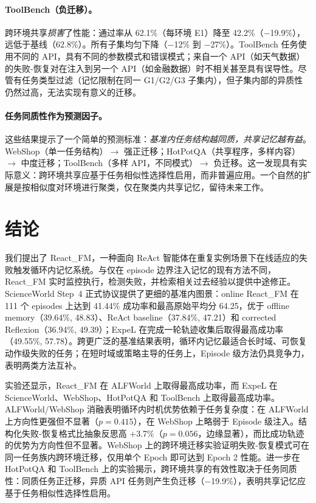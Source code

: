 \documentclass[11pt,a4paper]{article}
\newcommand{\method}{React\_FM}
\begin{document}
\paragraph{ToolBench（负迁移）。} 跨环境共享\emph{损害}了性能：通过率从 62.1\%（每环境 E1）降至 42.2\%（$-$19.9\%），远低于基线（62.8\%）。所有子集均匀下降（$-$12\% 到 $-$27\%）。ToolBench 任务使用不同的 API，具有不同的参数模式和错误模式；来自一个 API（如天气数据）的失败-恢复对在注入到另一个 API（如金融数据）时不相关甚至具有误导性。尽管有任务类型过滤（记忆限制在同一 G1/G2/G3 子集内），但子集内部的异质性仍然过高，无法实现有意义的迁移。

\paragraph{任务同质性作为预测因子。} 这些结果提示了一个简单的预测标准：\emph{基准内任务结构越同质，共享记忆越有益}。WebShop（单一任务结构）$\to$ 强正迁移；HotPotQA（共享程序，多样内容）$\to$ 中度迁移；ToolBench（多样 API，不同模式）$\to$ 负迁移。这一发现具有实际意义：跨环境共享应基于任务相似性选择性启用，而非普遍应用。一个自然的扩展是按相似度对环境进行聚类，仅在聚类内共享记忆，留待未来工作。

\section{结论}

我们提出了 \method{}，一种面向 ReAct 智能体在重复实例场景下在线适应的失败触发循环内记忆系统。与仅在 episode 边界注入记忆的现有方法不同，\method{} 实时监控执行，检测失败，并检索相关过去经验以提供中途修正。ScienceWorld Step~4 正式协议提供了更细的基准内图景：online \method{} 在 111 个 episodes 上达到 41.44\% 成功率和最高原始平均分 64.25，优于 offline memory（39.64\%, 48.83）、ReAct baseline（37.84\%, 47.21）和 corrected Reflexion（36.94\%, 49.39）；ExpeL 在完成一轮轨迹收集后取得最高成功率（49.55\%, 57.78）。跨更广泛的基准结果表明，循环内记忆最适合长时域、可恢复动作级失败的任务；在短时域或策略主导的任务上，Episode 级方法仍具竞争力，表明两类方法互补。

实验还显示，\method{} 在 ALFWorld 上取得最高成功率，而 ExpeL 在 ScienceWorld、WebShop、HotPotQA 和 ToolBench 上取得最高成功率。ALFWorld/WebShop 消融表明循环内时机优势依赖于任务复杂度：在 ALFWorld 上方向性更强但不显著（$p{=}0.415$），在 WebShop 上略弱于 Episode 级注入。结构化失败-恢复格式比抽象反思高 +3.7\%（$p{=}0.056$，边缘显著），而比成功轨迹的优势为方向性但不显著。WebShop 上的跨环境迁移实验证明失败-恢复模式可在同一任务族内跨环境迁移，仅用单个 Epoch 即可达到 Epoch 2 性能。进一步在 HotPotQA 和 ToolBench 上的实验揭示，跨环境共享的有效性取决于任务同质性：同质任务正迁移，异质 API 任务则产生负迁移（$-$19.9\%），表明共享记忆应基于任务相似性选择性启用。
\end{document}
